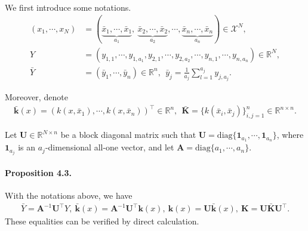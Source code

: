 \documentclass{article}
\begin{document}
\paragraph{} We first introduce some notations.
\begin{align*}
	(x_1,\cdots, x_N) &= (\underbrace{\bar{x}_1,\cdots,\bar{x}_1}_{a_1},\ \underbrace{\bar{x}_2,\cdots,\bar{x}_2}_{a_2},\cdots,\underbrace{\bar{x}_n,\cdots,\bar{x}_n}_{a_n}) \in\mathcal{X}^N,\tag{4.15}\\
	Y &= (y_{1,1},\cdots,y_{1,a_1},y_{2,1},\cdots,y_{2,a_2},\cdots,y_{n,1},\cdots,y_{n,a_n})\in\mathbb{R}^N,\tag{4.16}\\
	\bar{Y} &= (\bar{y}_1,\cdots,\bar{y}_n)\in\mathbb{R}^n,\ \ \bar{y}_j = \frac{1}{a_j}\sum_{l=1}^{a_j}y_{j,a_j}.\tag{4.17}
\end{align*}

Moreover, denote
\begin{align*}
	\bar{\mathbf{k}}(x) = \left(k(x,\bar{x}_1),\cdots,k(x,\bar{x}_n)\right)^\top\in\mathbb{R}^n,\ \ \bar{\mathbf{K}} = \lbrace k(\bar{x}_i,\bar{x}_j)\rbrace_{i,j=1}^n\in\mathbb{R}^{n\times n}.\tag{4.18}
\end{align*}

Let $\mathbf{U}\in\mathbb{R}^{N\times n}$ be a block diagonal matrix such that $\mathbf{U}=\mathrm{diag}\lbrace \mathbf{1}_ {a_ 1},\cdots,\mathbf{1}_ {a_ n}\rbrace$, where $\mathbf{1}_ {a_j}$ is an $a_j$-dimensional all-one vector, and let $\mathbf{A} = \mathrm{diag}\lbrace a_1,\cdots,a_n\rbrace.$ 

\paragraph{Proposition 4.3.} With the notations above, we have \begin{align*}
	\bar{Y} = \mathbf{A}^{-1}\mathbf{U}^\top Y,\ \bar{\mathbf{k}}(x) = \mathbf{A}^{-1}\mathbf{U}^\top\mathbf{k}(x),\ \mathbf{k}(x) = \mathbf{U}\bar{\mathbf{k}}(x),\ \mathbf{K} = \mathbf{U}\bar{\mathbf{K}}\mathbf{U}^\top.\tag{4.19}
\end{align*}
These equalities can be verified by direct calculation.
\end{document}
